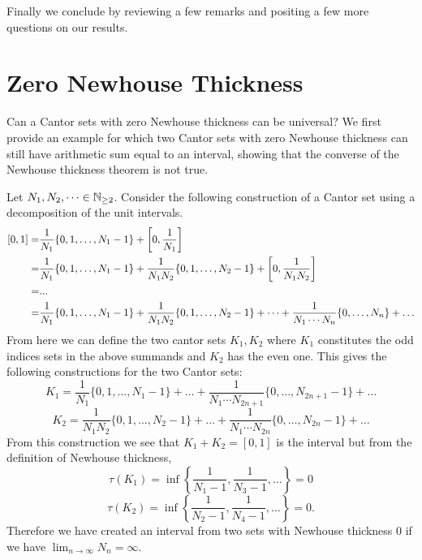 Finally we conclude by reviewing a few remarks and positing a few more questions on our results. 

\section{Zero Newhouse Thickness} 
Can a Cantor sets with zero Newhouse thickness can be universal? We first  provide an example for  which two Cantor sets with zero Newhouse thickness can still have arithmetic sum equal  to an interval,  showing that the converse of the Newhouse thickness theorem is  not true.   %
\begin{example}
{\rm Let $N_1, N_2, \dots \in \mathbb{N}_{\geq 2}$. Consider the following construction of a Cantor set using a decomposition of the unit intervals. }
$$\begin{aligned}
    \relax[0,1] = &\frac{1}{N_1}\{0,1, \dots, N_1-1\} + \left[0,\frac{1}{N_1}\right]\\
    = & \frac{1}{N_1}\{0,1, \dots, N_1-1\} + \frac{1}{N_1 N_2}\{0,1, \dots, N_2-1\} + \left[0,\frac{1}{N_1 N_2}\right]\\
    =&...\\
    =&\frac{1}{N_1}\{0,1, \dots, N_1-1\} +  \frac{1}{N_1 N_2}\{0,1, \dots, N_2-1\} + \dots + \frac{1}{N_1 \cdots N_n} \{0,\dots, N_n \}+ \dots
\end{aligned}$$
{\rm From here we can define the two cantor sets $K_1, K_2$ where $K_1$ constitutes the odd indices sets in the above summands and $K_2$ has the even one.   This gives the following constructions for the two Cantor sets: }
$$K_1 = \frac{1}{N_1}\{0,1, \dots, N_1-1\}  + \dots + \frac{1}{N_1 \cdots N_{2n+1}} \{0,\dots, N_{2n+1}-1 \}+ \dots$$
$$K_2 = \frac{1}{N_1N_2}\{0,1, \dots, N_2-1\}  + \dots +\frac{1}{N_1 \cdots N_{2n}} \{0,\dots, N_{2n}-1 \}+ \dots$$
{\rm From this construction we see that $K_1 + K_2 = [0,1]$ is the interval but from the definition of Newhouse thickness, }
$$\tau(K_1) = \inf \left\{\frac{1}{N_1-1}, \frac{1}{N_3-1},\dots\right\} = 0 $$
$$\tau(K_2) = \inf \left\{\frac{1}{N_2-1}, \frac{1}{N_4-1},\dots\right\} = 0.$$
{\rm Therefore we have created an interval from two sets with Newhouse thickness $0$ if we have $\lim_{n\to\infty} N_n = \infty$. }
\end{example}
\vspace{0.5cm}  

